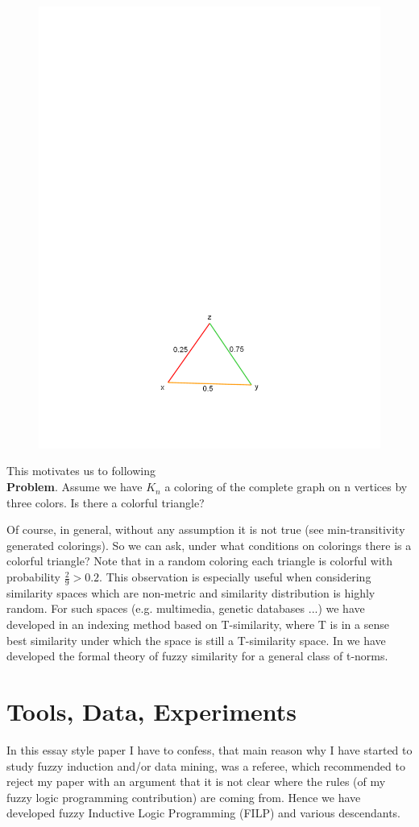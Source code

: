 \begin{figure}[htbp]
	\centering
		\includegraphics[width=0.4\hsize]{img/triangle}
	\caption{} \label{fig:triangle}
\end{figure}

      This motivates us to following 
\\\textbf{Problem}. Assume we have $K_n$ a coloring of the complete graph on n vertices by three colors. Is there a colorful triangle?
      
      Of course, in general, without any assumption it is not true (see min-transitivity generated colorings). So we can ask, under what conditions on colorings there is a colorful triangle? Note that in a random coloring each triangle is colorful with probability $\frac{2}{9} > 0.2$. This observation is especially useful when considering similarity spaces which are non-metric and similarity distribution is highly random. For such spaces (e.g. multimedia, genetic databases ...) we have developed  in \cite{44} an indexing method based on T-similarity, where T is in a sense best similarity under which the space is still a T-similarity space. In \cite{15} we have developed the formal theory of fuzzy similarity for a general class of t-norms. 

\section{Tools, Data, Experiments}
     
     In this essay style paper I have to confess, that main reason why I have started to study fuzzy induction and/or data mining, was a referee, which recommended to reject my paper with an argument that it is not clear where the rules (of my fuzzy logic programming contribution) are coming from. Hence we have developed fuzzy Inductive Logic Programming (FILP) and various descendants. 

